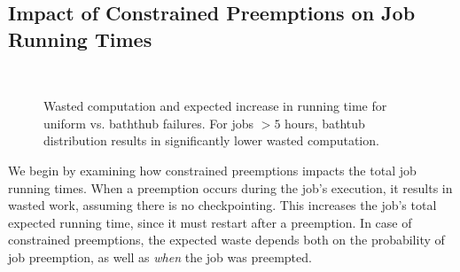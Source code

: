 \vspace*{\subsecspace}
\subsection{Impact of Constrained Preemptions on Job Running Times}

\begin{figure}[t]
  \vspace*{\myfigspace}    
  \\
  \vspace*{-0.4cm}
    \vspace*{-0.4cm}
    \caption{Wasted computation and expected increase in running time for uniform vs. baththub failures. For jobs $>5$ hours, bathtub distribution results in significantly lower wasted computation.}
\vspace*{\myfigspace}    
  \label{fig:vs-uniform-both}
  
\end{figure}


We begin by examining how constrained preemptions impacts the total job running times. 
When a preemption occurs during the job's execution, it results in wasted work, assuming there is no checkpointing. 
This increases the job's total expected running time, since it must restart after a preemption.
In case of constrained preemptions, the expected waste depends both on the probability of job preemption, as well as \emph{when} the job was preempted. 


